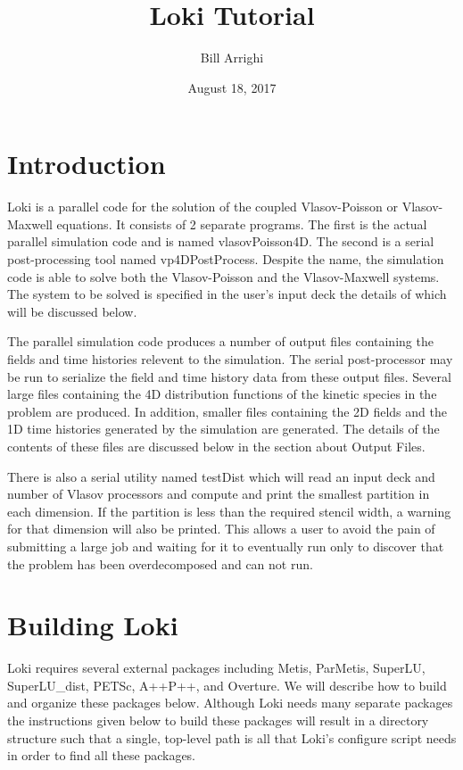 \documentclass[11pt]{amsart}
\title{Loki Tutorial}
\author{Bill Arrighi}
\date{August 18, 2017}
\begin{document}
\maketitle
\section*{Introduction}
Loki is a parallel code for the solution of the coupled Vlasov-Poisson or
Vlasov-Maxwell equations.  It consists of 2 separate programs.  The first is
the actual parallel simulation code and is named vlasovPoisson4D.  The
second is a serial post-processing tool named vp4DPostProcess.  Despite the
name, the simulation code is able to solve both the Vlasov-Poisson and the
Vlasov-Maxwell systems.  The system to be solved is specified in the user's
input deck the details of which will be discussed below.

The parallel simulation code produces a number of output files containing the
fields and time histories relevent to the simulation.  The serial
post-processor may be run to serialize the field and time history data from
these output files.  Several large files containing the 4D distribution
functions of the kinetic species in the problem are produced.  In addition,
smaller files containing the 2D fields and the 1D time histories generated by
the simulation are generated.  The details of the contents of these files are
discussed below in the section about Output Files.

There is also a serial utility named testDist which will read an input deck and
number of Vlasov processors and compute and print the smallest partition in each
dimension.  If the partition is less than the required stencil width, a warning
for that dimension will also be printed.  This allows a user to avoid the pain
of submitting a large job and waiting for it to eventually run only to discover
that the problem has been overdecomposed and can not run.

\section*{Building Loki}
Loki requires several external packages including Metis, ParMetis, SuperLU, \\
SuperLU\_dist, PETSc, A++P++, and Overture.  We will describe how to build and
organize these packages below.  Although Loki needs many separate packages
the instructions given below to build these packages will result in a directory
structure such that a single, top-level path is all that Loki's configure
script needs in order to find all these packages.
\end{document}
